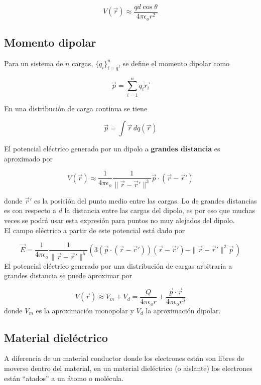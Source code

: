 \[V(\Vec{r})\approx\frac{qd\cos{\theta}}{4\pi\epsilon_o r^2}\]


\subsection{Momento dipolar}

Para un sistema de $n$ cargas, $\{q_i\}^n_{i=q}$, se define el momento dipolar como

\[\Vec{p}=\sum^n_{i=1}q_i\Vec{r_i}\]

En una distribución de carga continua se tiene

\[\Vec{p}=\int\Vec{r}\,dq(\Vec{r})\]
\bigbreak

El potencial eléctrico generado por un dipolo a \textbf{grandes distancia} es aproximado por

\[V(\Vec{r}) \approx \frac{1}{4\pi\epsilon_o}
\frac{1}{\|\Vec{r}-\Vec{r}'\|^3}\Vec{p}\cdot
(\Vec{r}-\Vec{r}')\]
\bigbreak

donde $\Vec{r}'$ es la posición del punto medio entre las cargas. Lo de grandes distancias es con respecto a $d$ la distancia entre las cargas del dipolo, es por eso que muchas veces se podrá usar esta expresión para puntos no muy alejados del dipolo.\\

El campo eléctrico a partir de este potencial está dado por

\[\Vec{E}= \frac{1}{4\pi\epsilon_o}
\frac{1}{\|\Vec{r}-\Vec{r}'\|^5}\left(3(\Vec{p}\cdot
(\Vec{r}-\Vec{r}'))(\Vec{r}-\Vec{r}')-\|\Vec{r}-\Vec{r}'\|^2\Vec{p}\,\right)\]
\bigbreak
El potencial eléctrico generado por una distribución de cargas arbitraria a grandes distancia se puede aproximar por

\[V(\Vec{r}) \approx V_m + V_d = 
\frac{Q}{4\pi\epsilon_o r}+\frac{\Vec{p}\cdot\Vec{r}}{4\pi\epsilon_o r^3}\]
\bigbreak
donde $V_m$ es la aproximación monopolar y $V_d$ la aproximación dipolar.\\


\subsection{Material dieléctrico}

A diferencia de un material conductor donde los electrones están son libres de moverse dentro del material, en un material dieléctrico (o aislante) los electrones están ``atados'' a un átomo o molécula.\\


